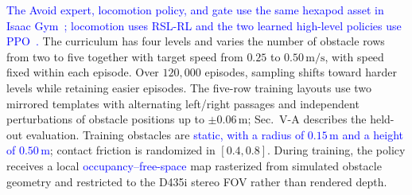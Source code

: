 \documentclass[letterpaper, 10 pt, conference]{ieeeconf}
\newcommand{\msec}{\,\mathrm{m/s}}
\newcommand{\rev}[1]{\textcolor{blue}{#1}}
\begin{document}
\rev{The Avoid expert, locomotion policy, and gate use the same hexapod asset in Isaac Gym~\cite{ref:isaac}; locomotion uses RSL-RL and the two learned high-level policies use PPO~\cite{ref:ppo}.} The curriculum has four levels and varies the number of obstacle rows from two to five together with target speed from $0.25$ to $0.50\msec$, with speed fixed within each episode. Over $120{,}000$ episodes, sampling shifts toward harder levels while retaining easier episodes. The five-row training layouts use two mirrored templates with alternating left/right passages and independent perturbations of obstacle positions up to $\pm0.06\,\mathrm{m}$; Sec.~V-A describes the held-out evaluation. Training obstacles are \rev{static, with a radius of $0.15\,\mathrm{m}$ and a height of $0.50\,\mathrm{m}$}; contact friction is randomized in $[0.4,0.8]$. During training, the policy receives a local \rev{occupancy--free-space} map rasterized from simulated obstacle geometry and restricted to the D435i stereo FOV rather than rendered depth.
\end{document}
